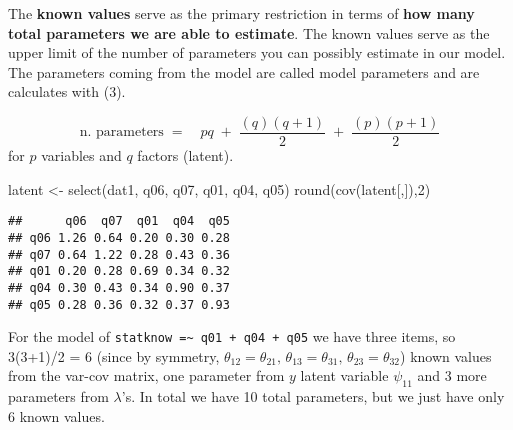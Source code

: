 \documentclass[
]{article}
\newenvironment{Shaded}{\begin{snugshade}}{\end{snugshade}}
\newcommand{\DecValTok}[1]{\textcolor[rgb]{0.00,0.00,0.81}{#1}}
\newcommand{\FunctionTok}[1]{\textcolor[rgb]{0.00,0.00,0.00}{#1}}
\newcommand{\NormalTok}[1]{#1}
\newcommand{\OtherTok}[1]{\textcolor[rgb]{0.56,0.35,0.01}{#1}}
\begin{document}
The \textbf{known values} serve as the primary restriction in terms of
\textbf{how many total parameters we are able to estimate}. The known
values serve as the upper limit of the number of parameters you can
possibly estimate in our model. The parameters coming from the model are
called model parameters and are calculates with (3).

\[
\tag{3}
\text{n. parameters}\;=\quad pq\; +\; \frac{(q)(q+1)}{2} \;+\;\frac{(p)(p+1)}{2}
\] for \(p\) variables and \(q\) factors (latent).

\begin{Shaded}
\begin{Highlighting}[]
\NormalTok{latent }\OtherTok{\textless{}{-}} \FunctionTok{select}\NormalTok{(dat1, q06, q07, q01, q04, q05)}
\FunctionTok{round}\NormalTok{(}\FunctionTok{cov}\NormalTok{(latent[,]),}\DecValTok{2}\NormalTok{)}
\end{Highlighting}
\end{Shaded}

\begin{verbatim}
##      q06  q07  q01  q04  q05
## q06 1.26 0.64 0.20 0.30 0.28
## q07 0.64 1.22 0.28 0.43 0.36
## q01 0.20 0.28 0.69 0.34 0.32
## q04 0.30 0.43 0.34 0.90 0.37
## q05 0.28 0.36 0.32 0.37 0.93
\end{verbatim}

For the model of
\texttt{statknow\ =\textasciitilde{}\ q01\ +\ q04\ +\ q05} we have three
items, so 3(3+1)/2 = 6 (since by symmetry,
\(\theta_{12}=\theta_{21},\, \theta_{13}=\theta_{31},\, \theta_{23}=\theta_{32}\))
known values from the var-cov matrix, one parameter from \(y\) latent
variable \(\psi_{11}\) and 3 more parameters from \(\lambda\)'s. In
total we have 10 total parameters, but we just have only 6 known values.
\end{document}
